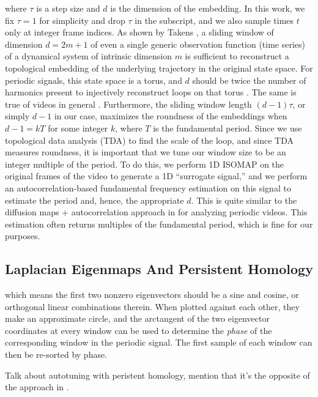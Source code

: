 \documentclass{article}
\begin{document}
where $\tau$ is a step size and $d$ is the dimension of the embedding.  In this work, we fix $\tau = 1$ for simplicity and drop $\tau$ in the subscript, and we also sample times $t$ only at integer frame indices.  As shown by Takens \cite{takens1981detecting}, a sliding window of dimension $d = 2m+1$ of even a single generic observation function (time series) of a dynamical system of intrinsic dimension $m$ is sufficient to reconstruct a topological embedding of the underlying trajectory in the original state space.  For periodic signals, this state space is a torus, and $d$ should be twice the number of harmonics present to injectively reconstruct loops on that torus \cite{perea2015sliding}.  The same is true of videos in general \cite{tralie2017quasi}.  Furthermore, the sliding window length $(d-1) \tau$, or simply $d-1$ in our case, maximizes the roundness of the embeddings when $d-1 = k T$ for some integer $k$, where $T$ is the fundamental period.  Since we use topological data analysis (TDA) to find the scale of the loop, and since TDA measures roundness, it is important that we tune our window size to be an integer multiple of the period.  To do this, we perform 1D ISOMAP \cite{tenenbaum2000global} on the original frames of the video to generate a 1D ``surrogate signal,'' and we perform an autocorrelation-based fundamental frequency estimation \cite{Mcleod05asmarter} on this signal to estimate the period and, hence, the appropriate $d$.  This is quite similar to the diffusion maps + autocorrelation approach in \cite{tralie2017quasi} for analyzing periodic videos.  This estimation often returns multiples of the fundamental period, which is fine for our purposes.

\subsection{Laplacian Eigenmaps And Persistent Homology}
\label{sec:laplacian}



which means the first two nonzero eigenvectors should be a sine and cosine, or orthogonal linear combinations therein.  When plotted against each other, they make an approximate circle, and the arctangent of the two eigenvector coordinates at every window can be used to determine the {\em phase} of the corresponding window in the periodic signal.  The first sample of each window can then be re-sorted by phase.

Talk about autotuning with peristent homology, mention that it's the opposite of the approach in \cite{bendich2011improving}.
\end{document}
